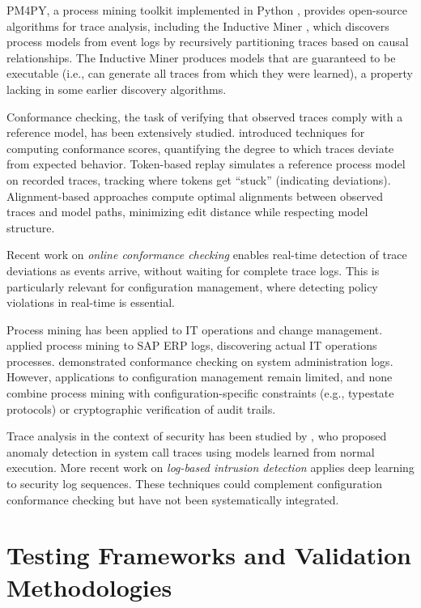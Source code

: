 PM4PY, a process mining toolkit implemented in Python \citep{Leemans2019}, provides open-source algorithms for trace analysis, including the Inductive Miner \citep{Leemans2013}, which discovers process models from event logs by recursively partitioning traces based on causal relationships. The Inductive Miner produces models that are guaranteed to be executable (i.e., can generate all traces from which they were learned), a property lacking in some earlier discovery algorithms.

Conformance checking, the task of verifying that observed traces comply with a reference model, has been extensively studied. \citet{Rozinat2008} introduced techniques for computing conformance scores, quantifying the degree to which traces deviate from expected behavior. Token-based replay \citep{VanDerAalst2010} simulates a reference process model on recorded traces, tracking where tokens get ``stuck'' (indicating deviations). Alignment-based approaches \citep{Adriansyah2011} compute optimal alignments between observed traces and model paths, minimizing edit distance while respecting model structure.

Recent work on \emph{online conformance checking} \citep{Carmona2017, Tavares2019} enables real-time detection of trace deviations as events arrive, without waiting for complete trace logs. This is particularly relevant for configuration management, where detecting policy violations in real-time is essential.

Process mining has been applied to IT operations and change management. \citet{Mannhardt2016} applied process mining to SAP ERP logs, discovering actual IT operations processes. \citet{Rebuge2011} demonstrated conformance checking on system administration logs. However, applications to configuration management remain limited, and none combine process mining with configuration-specific constraints (e.g., typestate protocols) or cryptographic verification of audit trails.

Trace analysis in the context of security has been studied by \citet{Sekar2005}, who proposed anomaly detection in system call traces using models learned from normal execution. More recent work on \emph{log-based intrusion detection} \citep{Du2017} applies deep learning to security log sequences. These techniques could complement configuration conformance checking but have not been systematically integrated.

\section{Testing Frameworks and Validation Methodologies}

